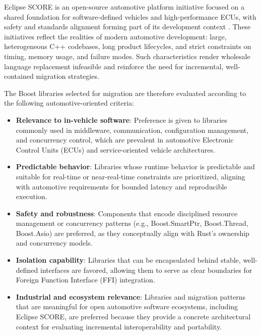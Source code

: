         Eclipse \gls{SCORE} is an open-source automotive platform initiative focused on a shared
        foundation for software-defined vehicles and high-performance ECUs, with safety and
        standards alignment forming part of its development context \parencite{eclipse_score}. These initiatives reflect the
        realities of modern automotive development: large, heterogeneous C++ codebases,
        long product lifecycles, and strict constraints on timing, memory usage, and
        failure modes. Such characteristics render wholesale language replacement
        infeasible and reinforce the need for incremental, well-contained migration
        strategies.

        The Boost libraries selected for migration are therefore evaluated according to
        the following automotive-oriented criteria:

        \begin{itemize}
        \item \textbf{Relevance to in-vehicle software}: Preference is given to
        libraries commonly used in middleware, communication, configuration
        management, and concurrency control, which are prevalent in automotive
        Electronic Control Units (ECUs) and service-oriented vehicle architectures.

        \item \textbf{Predictable behavior}: Libraries whose runtime behavior is
        predictable and suitable for real-time or near-real-time constraints are
        prioritized, aligning with automotive requirements for bounded latency and
        reproducible execution.

        \item \textbf{Safety and robustness}: Components that encode disciplined
        resource management or concurrency patterns (e.g., Boost.SmartPtr,
        Boost.Thread, Boost.Asio) are preferred, as they conceptually align with
        Rust’s ownership and concurrency models.

        \item \textbf{Isolation capability}: Libraries that can be encapsulated
        behind stable, well-defined interfaces are favored, allowing them to serve
        as clear boundaries for Foreign Function Interface (FFI) integration.

        \item \textbf{Industrial and ecosystem relevance}: Libraries and migration patterns
        that are meaningful for open automotive software ecosystems, including Eclipse
        \gls{SCORE}, are preferred because they provide a concrete architectural context
        for evaluating incremental interoperability and portability.
        \end{itemize}

